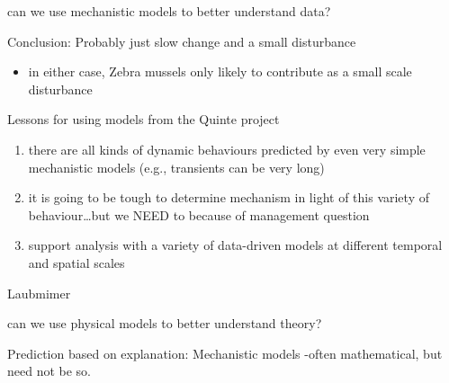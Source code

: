 \documentclass[
  ignorenonframetext,
]{beamer}
\providecommand{\tightlist}{%
  \setlength{\itemsep}{0pt}\setlength{\parskip}{0pt}}
\begin{document}
\begin{frame}{can we use mechanistic models to better understand data?}
\begin{block}{Conclusion: Probably just slow change and a small
disturbance}
\begin{itemize}
\tightlist
\item
  in either case, Zebra mussels only likely to contribute as a small
  scale disturbance
\end{itemize}
\end{block}

\begin{block}{Lessons for using models from the Quinte project}
\protect\hypertarget{lessons-for-using-models-from-the-quinte-project}{}
\begin{enumerate}
\tightlist
\item
  there are all kinds of dynamic behaviours predicted by even very
  simple mechanistic models (e.g., transients can be very long)
\item
  it is going to be tough to determine mechanism in light of this
  variety of behaviour\ldots but we NEED to because of management
  question
\item
  support analysis with a variety of data-driven models at different
  temporal and spatial scales
\end{enumerate}
\end{block}

\begin{block}{Laubmimer}
\protect\hypertarget{laubmimer}{}
\end{block}
\end{frame}

\begin{frame}{can we use physical models to better understand theory?}
\protect\hypertarget{can-we-use-physical-models-to-better-understand-theory}{}
\begin{block}{Prediction based on explanation: Mechanistic models}
\protect\hypertarget{prediction-based-on-explanation-mechanistic-models}{}
-often mathematical, but need not be so.
\end{block}
\end{frame}
\end{document}
